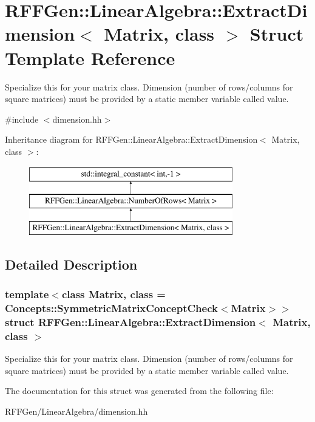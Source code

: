 \hypertarget{structRFFGen_1_1LinearAlgebra_1_1ExtractDimension}{\section{R\-F\-F\-Gen\-:\-:Linear\-Algebra\-:\-:Extract\-Dimension$<$ Matrix, class $>$ Struct Template Reference}
\label{structRFFGen_1_1LinearAlgebra_1_1ExtractDimension}
}


Specialize this for your matrix class. Dimension (number of rows/columns for square matrices) must be provided by a static member variable called value.  




{\ttfamily \#include $<$dimension.\-hh$>$}

Inheritance diagram for R\-F\-F\-Gen\-:\-:Linear\-Algebra\-:\-:Extract\-Dimension$<$ Matrix, class $>$\-:\begin{figure}[H]
\begin{center}
\leavevmode
\includegraphics[height=3.000000cm]{structRFFGen_1_1LinearAlgebra_1_1ExtractDimension}
\end{center}
\end{figure}


\subsection{Detailed Description}
\subsubsection*{template$<$class Matrix, class = Concepts\-::\-Symmetric\-Matrix\-Concept\-Check$<$\-Matrix$>$$>$struct R\-F\-F\-Gen\-::\-Linear\-Algebra\-::\-Extract\-Dimension$<$ Matrix, class $>$}

Specialize this for your matrix class. Dimension (number of rows/columns for square matrices) must be provided by a static member variable called value. 

The documentation for this struct was generated from the following file\-:\begin{DoxyCompactItemize}
\item 
R\-F\-F\-Gen/\-Linear\-Algebra/dimension.\-hh\end{DoxyCompactItemize}
